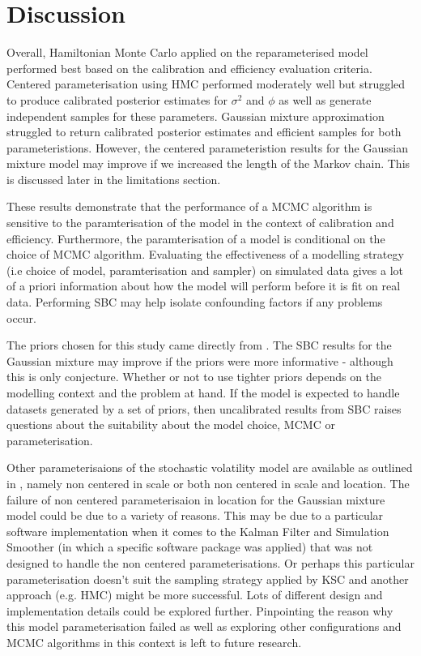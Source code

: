 \documentclass[12pt, a4paper]{article}
\begin{document}
\section{Discussion}
Overall, Hamiltonian Monte Carlo applied on the reparameterised model performed best based on the calibration and efficiency evaluation criteria. Centered parameterisation using HMC performed moderately well but struggled to produce calibrated posterior estimates for $\sigma^2$ and $\phi$ as well as generate independent samples for these parameters. Gaussian mixture approximation struggled to return calibrated posterior estimates and efficient samples for both parameteristions. However, the centered parameteristion results for the Gaussian mixture model may improve if we increased the length of the Markov chain. This is discussed later in the limitations section. 

These results demonstrate that the performance of a MCMC algorithm is sensitive to the paramterisation of the model in the context of calibration and efficiency. Furthermore, the paramterisation of a model is conditional on the choice of MCMC algorithm. Evaluating the effectiveness of a modelling strategy (i.e choice of model, paramterisation and sampler) on simulated data gives a lot of a priori information about how the model will perform before it is fit on real data. Performing SBC may help isolate confounding factors if any problems occur. 

The priors chosen for this study came directly from \citet{kim1998stochastic}. The SBC results for the Gaussian mixture may improve if the priors were more informative - although this is only conjecture. Whether or not to use tighter priors depends on the modelling context and the problem at hand. If the model is expected to handle datasets generated by a set of priors, then uncalibrated results from SBC raises questions about the suitability about the model choice, MCMC or parameterisation. 

Other parameterisaions of the stochastic volatility model are available as outlined in \citet{strickland2008parameterisation}, namely non centered in scale or both non centered in scale and location. The failure of non centered parameterisaion in location for the Gaussian mixture model could be due to a variety of reasons. This may be due to a particular software implementation when it comes to the Kalman Filter and Simulation Smoother (in which a specific software package was applied) that was not designed to handle the non centered parameterisations. Or perhaps this particular parameterisation doesn't suit the sampling strategy applied by KSC and another approach (e.g. HMC) might be more successful. Lots of different design and implementation details could be explored further. Pinpointing the reason why this model parameterisation failed as well as exploring other configurations and MCMC algorithms in this context is left to future research.
\end{document}
